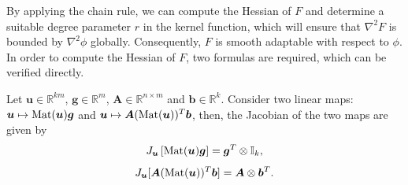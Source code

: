\documentclass[twoside,11pt]{article}
\newcommand{\R}{\mathbb R}
\def\Mat{{\rm Mat}}
\def\vb{{\bm{b}}}
\def\vg{{\bm{g}}}
\def\vu{{\bm{u}}}
\def\mA{{\bm{A}}}
\begin{document}
By applying the chain rule, we can compute the Hessian of $F$ and determine a suitable degree parameter $r$ in the kernel function, which will ensure that $\nabla^2F$ is bounded by $\nabla^2\phi$ globally. Consequently, $F$ is smooth adaptable with respect to $\phi$.
In order to compute the Hessian of $F$, two formulas are required, which can be verified directly.\vspace{-0.1cm}
\begin{lemma}
Let $\vu\in\R^{km}$, $\vg\in\R^m$, $\mA \in\R^{n\times m}$ and $\vb\in\R^k$. Consider two linear maps: $\vu\mapsto\Mat(\vu)\vg$ and $\vu\mapsto \mA(\Mat(\vu))^T\vb$, then, the Jacobian of the two maps are given by
\[
J_{\vu}\left[\Mat(\vu)\vg\right]=\vg^T\otimes\mathbb{I}_k,
\]
\[
J_{\vu}[\mA(\Mat(\vu))^T\vb]=\mA \otimes \vb^T.
\]
\label{Jac-Hess-aux-lemma}
\end{lemma}\vspace{-0.5cm}
\end{document}
